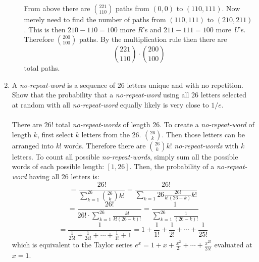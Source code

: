 \documentclass[11pt, oneside]{article}   	%
\begin{document}
\begin{enumerate}
\begin{enumerate}
				From above there are $\binom{221}{110}$ paths from $(0, 0)$ to $(110, 111)$. Now merely need to find the number of paths from $(110, 111)$ to $(210, 211)$. This is then $210 - 110 = 100$ more \textit{R}'s and $211 - 111 = 100$ more \textit{U}'s.
				Therefore $\binom{200}{100}$ paths. By the multiplication rule then there are \[ \binom{221}{110} \cdot \binom{200}{100} \] total paths.
			\end{enumerate}
		\item A \textit{no-repeat-word} is a sequence of 26 letters unique and with no repetition. Show that the probability that a \textit{no-repeat-word} using all 26 letters selected at random with all \textit{no-repeat-word}  equally likely is very close to $1/e$. \\\\
			There are $26!$ total \textit{no-repeat-words} of length 26. To create a \textit{no-repeat-word} of length $k$, first select $k$ letters from the 26. $\binom{26}{k}$. Then those letters can be arranged into $k!$ words. Therefore there are $\binom{26}{k}k!$
			\textit{no-repeat-words} with $k$ letters. To count all possible \textit{no-repeat-words}, simply sum all the possible words of each possible length: $[1, 26]$. Then, the probability of a \textit{no-repeat-word} having all 26 letters is:
			\[ 
				= \frac{26!}{\sum_{k=1}^{26} \binom{26}{k} k!} = \frac{26!}{\sum_{k=1}{26} \frac{26!}{k!(26-k)} k!}
			\]
			\[
				= \frac{26!}{26! \cdot \sum_{k=1}^{26} \frac{k!}{k!(26-k)!} } = \frac{1}{\sum_{k=1}^{26} \frac{1}{(26-k)!}}
			\]
			\[
				= \frac{1}{ \frac{1}{25!} + \frac{1}{24!} + \cdots + \frac{1}{1!} + 1} = 1 + \frac{1}{1!} + \frac{1}{2!} + \cdots + \frac{1}{25!}
			\]
			which is equivalent to the Taylor series $e^x = 1 + x + \frac{x^2}{2!} + \cdots + \frac{x^{25}}{25!}$ evaluated at $x=1$.
	\end{enumerate}
\end{document}
